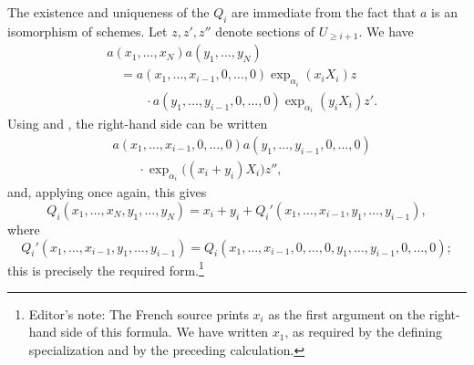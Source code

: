 The existence and uniqueness of the \(Q_i\) are immediate from
the fact that \(a\) is an isomorphism of schemes. Let
\(z,z',z''\) denote sections of \(U_{\geq i+1}\). We have
\[
\begin{split}
  &a(x_1,\ldots,x_N)a(y_1,\ldots,y_N)\\
  &\quad =
  a(x_1,\ldots,x_{i-1},0,\ldots,0)
  \exp_{\alpha_i}(x_iX_i)z\\
  &\qquad\quad{}\cdot
  a(y_1,\ldots,y_{i-1},0,\ldots,0)
  \exp_{\alpha_i}(y_iX_i)z'.
\end{split}
\]
Using  \textup{} and \textup{}, the right-hand side
can be written
\[
\begin{split}
  &a(x_1,\ldots,x_{i-1},0,\ldots,0)
  a(y_1,\ldots,y_{i-1},0,\ldots,0)\\
  &\qquad{}\cdot
  \exp_{\alpha_i}\bigl((x_i+y_i)X_i\bigr)z'',
\end{split}
\]
and, applying  once again, this gives
\[
  Q_i(x_1,\ldots,x_N,y_1,\ldots,y_N)
  =
  x_i+y_i+
  Q_i'(x_1,\ldots,x_{i-1},y_1,\ldots,y_{i-1}),
\]
where
\[
  Q_i'(x_1,\ldots,x_{i-1},y_1,\ldots,y_{i-1})
  =
  Q_i(x_1,\ldots,x_{i-1},0,\ldots,0,
      y_1,\ldots,y_{i-1},0,\ldots,0);
\]
this is precisely the required form.\footnote{Editor's note: The
French source prints \(x_i\) as the first argument on the right-hand
side of this formula. We have written \(x_1\), as required by the
defining specialization and by the preceding calculation.}

